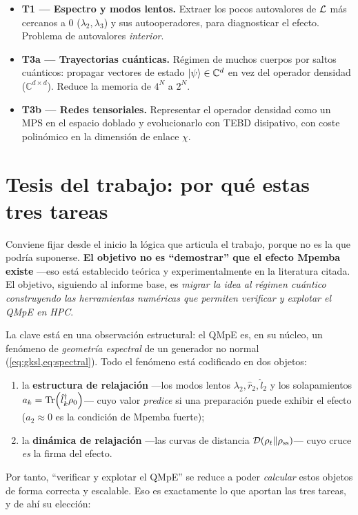 \begin{itemize}
  \item \textbf{T1 --- Espectro y modos lentos.} Extraer los pocos autovalores de
  $\mathcal{L}$ más cercanos a $0$ ($\lambda_2,\lambda_3$) y sus autooperadores, para
  diagnosticar el efecto. Problema de autovalores \emph{interior}.
  \item \textbf{T3a --- Trayectorias cuánticas.} Régimen de muchos cuerpos por
  saltos cuánticos: propagar vectores de estado $\ket{\psi}\in\mathbb{C}^d$ en vez
  del operador densidad ($\mathbb{C}^{d\times d}$). Reduce la memoria de $4^N$ a
  $2^N$.
  \item \textbf{T3b --- Redes tensoriales.} Representar el operador densidad como
  un MPS en el espacio doblado y evolucionarlo con TEBD disipativo, con coste
  polinómico en la dimensión de enlace $\chi$.
\end{itemize}

\section{Tesis del trabajo: por qué estas tres tareas}
\label{sec:tesis}

Conviene fijar desde el inicio la lógica que articula el trabajo, porque no es la
que podría suponerse. \textbf{El objetivo no es ``demostrar'' que el efecto Mpemba
existe} ---eso está establecido teórica y experimentalmente en la literatura
citada. El objetivo, siguiendo al informe base, es \emph{migrar la idea al régimen
cuántico construyendo las herramientas numéricas que permiten verificar y explotar
el QMpE en HPC}.

La clave está en una observación estructural: el QMpE es, en su núcleo, un
fenómeno de \emph{geometría espectral} de un generador no normal
(\cref{eq:gksl,eq:spectral}). Todo el fenómeno está codificado en dos objetos:
\begin{enumerate}
  \item la \textbf{estructura de relajación} ---los modos lentos $\lambda_2,\hat r_2,
  \hat l_2$ y los solapamientos $a_k=\Tr(\hat l_k^\dagger\rho_0)$--- cuyo valor
  \emph{predice} si una preparación puede exhibir el efecto ($a_2\!\approx\!0$ es
  la condición de Mpemba fuerte);
  \item la \textbf{dinámica de relajación} ---las curvas de distancia
  $\mathcal{D}(\rho_t\|\rho_{\mathrm{ss}})$--- cuyo cruce \emph{es} la firma del efecto.
\end{enumerate}
Por tanto, ``verificar y explotar el QMpE'' se reduce a poder \emph{calcular} estos
objetos de forma correcta y escalable. Eso es exactamente lo que aportan las tres
tareas, y de ahí su elección:


